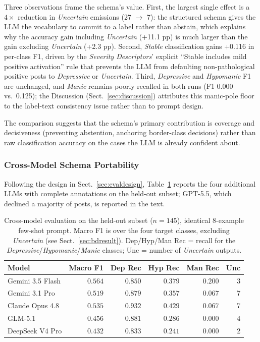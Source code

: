 \documentclass[runningheads]{llncs}
\begin{document}
Three observations frame the schema's value. First, the largest single effect is a $4\times$ reduction in \emph{Uncertain} emissions (27 $\rightarrow$ 7): the structured schema gives the LLM the vocabulary to commit to a label rather than abstain, which explains why the accuracy gain including \emph{Uncertain} (+11.1 pp) is much larger than the gain excluding \emph{Uncertain} (+2.3 pp). Second, \emph{Stable} classification gains +0.116 in per-class F1, driven by the \emph{Severity Descriptors}' explicit ``Stable includes mild positive activation'' rule that prevents the LLM from defaulting non-pathological positive posts to \emph{Depressive} or \emph{Uncertain}. Third, \emph{Depressive} and \emph{Hypomanic} F1 are unchanged, and \emph{Manic} remains poorly recalled in both runs (F1 0.000 vs.~0.125); the Discussion (Sect.~\ref{sec:discussion}) attributes this manic-pole floor to the label-text consistency issue rather than to prompt design.

The comparison suggests that the schema's primary contribution is coverage and decisiveness (preventing abstention, anchoring border-class decisions) rather than raw classification accuracy on the cases the LLM is already confident about.

\subsubsection{Cross-Model Schema Portability}
\label{sec:crossmodel}
 Following the design in Sect.~\ref{sec:evaldesign}, Table~\ref{tab:crossmodel} reports the four additional LLMs with complete annotations on the held-out subset; GPT-5.5, which declined a majority of posts, is reported in the text.

\begin{table}[t]
\caption{Cross-model evaluation on the held-out subset ($n = 145$), identical 8-example few-shot prompt. Macro F1 is over the four target classes, excluding \emph{Uncertain} (see Sect.~\ref{sec:bdresult}). Dep/Hyp/Man Rec = recall for the \emph{Depressive}/\emph{Hypomanic}/\emph{Manic} classes; Unc = number of \emph{Uncertain} outputs.}
\label{tab:crossmodel}
\centering
\setlength{\tabcolsep}{5pt}
\begin{tabular}{lrrrrr}
\toprule
\textbf{Model} & \textbf{Macro F1} & \textbf{Dep Rec} & \textbf{Hyp Rec} & \textbf{Man Rec} & \textbf{Unc} \\
\midrule
Gemini 3.5 Flash & $\mathbf{0.564}$ & $0.850$ & $0.379$ & $0.200$ & 3 \\
Gemini 3.1 Pro & $0.519$ & $0.879$ & $0.357$ & $0.067$ & 7 \\
Claude Opus 4.8 & $0.535$ & $0.932$ & $0.429$ & $0.067$ & 7 \\
GLM-5.1 & $0.456$ & $0.881$ & $0.286$ & $0.000$ & 4 \\
DeepSeek V4 Pro & $0.432$ & $0.833$ & $0.241$ & $0.000$ & 2 \\
\bottomrule
\end{tabular}
\end{table}
\end{document}

